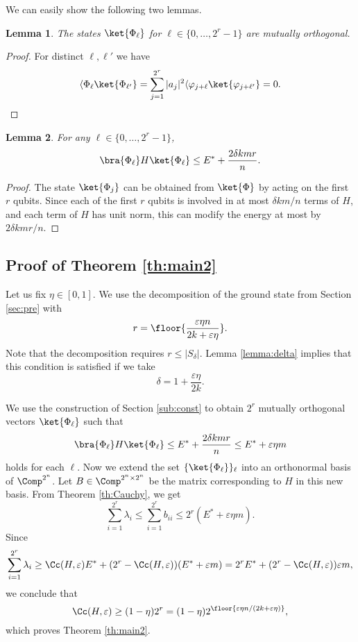 \documentclass[11pt,a4paper]{article}
\theoremstyle{plain}
\newtheorem{lemma}{Lemma}
\theoremstyle{definition}
\begin{document}
We can easily show the following two lemmas.
\begin{lemma}
	The states $\ket{\Phi_\ell}$ for $\ell\in \{0,\ldots,2^r-1\}$ are mutually orthogonal.
\end{lemma}
\begin{proof}
	For distinct $\ell,\ell'$ we have 
	\[
	\langle \Phi_\ell\ket{\Phi_{\ell'}}=
	\sum_{j=1}^{2^r}|a_j|^2\langle 
	\varphi_{j+\ell}\ket{\varphi_{j+\ell'}}=0.
	\]
\end{proof}
\begin{lemma}\label{lemma:energy}
	For any $\ell\in \{0,\ldots,2^r-1\}$,
	\[
	\bra{\Phi_\ell}H\ket{\Phi_\ell}\le E^\ast + \frac{2\delta k mr}{n}.
	\]
\end{lemma}
\begin{proof}
	The state $\ket{\Phi_j}$ can be obtained from $\ket{\Phi}$ by acting on the first $r$ qubits. Since each of the first $r$ qubits is involved in at most $\delta k m/n$ terms of $H$, and each term of $H$ has unit norm, this can modify the energy at most by $2\delta k mr/n$.
\end{proof}

\subsection{Proof of Theorem \ref{th:main2}}
Let us fix $\eta\in[0,1]$.
We use the decomposition of the ground state from Section \ref{sec:pre} with 
\[
r=\floor{\frac{\varepsilon\eta n}{2k+\varepsilon\eta}}.
\] 
Note that the decomposition requires $r\le |S_\delta|$. Lemma \ref{lemma:delta} implies that this condition is satisfied if we take
\[
\delta = 1+\frac{\varepsilon\eta}{2k}.
\]

We use the construction of Section \ref{sub:const} to obtain $2^{r}$ mutually orthogonal vectors $\ket{\Phi_\ell}$ such that 
\begin{equation*}\label{cond}
	\bra{\Phi_\ell}H\ket{\Phi_\ell}\le E^\ast + \frac{2\delta k mr}{n} \le E^\ast + \varepsilon\eta m
\end{equation*}
holds for each $\ell$. Now we extend the set $\{\ket{\Phi_\ell}\}_\ell$ into an orthonormal basis of $\Comp^{2^n}$. Let $B\in\Comp^{2^n\times 2^n}$ be the matrix corresponding to $H$ in this new basis.  From Theorem \ref{th:Cauchy}, we get
\[
\sum_{i=1}^{2^{r}} \lambda_i \le \sum_{i=1}^{2^{r}} b_{ii} \le 2^{r} \left(E^\ast + \varepsilon\eta m\right).
\]
Since 
\[
\sum_{i=1}^{2^{r}} \lambda_i\ge \Cc(H,\varepsilon) E^\ast +(2^{r}-\Cc(H,\varepsilon))(E^\ast+\varepsilon m)=2^{r}E^\ast +(2^{r}-\Cc(H,\varepsilon))\varepsilon m,
\]
we conclude that
\[
\Cc(H,\varepsilon)\ge (1-\eta)2^{r}= (1-\eta)2^{\floor{\varepsilon\eta n/(2k+\varepsilon\eta)}},
\]
which proves Theorem \ref{th:main2}.
%
%
\printbibliography
\end{document}
